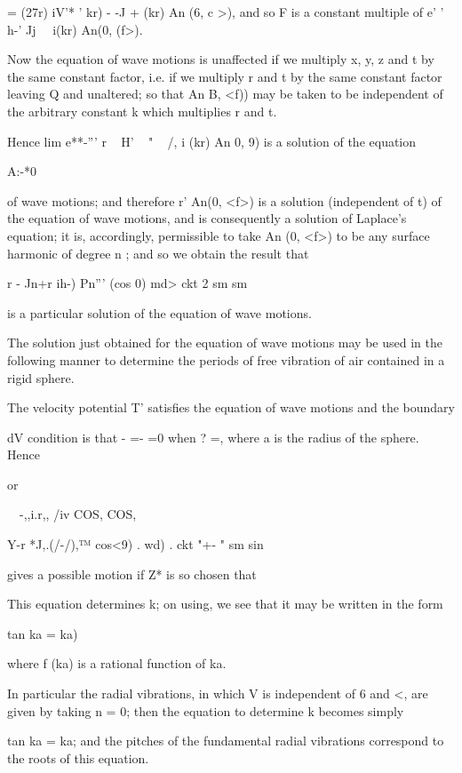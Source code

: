 = (27r) iV'* ' kr) - -J + (kr) An (6, c >), and so F is a constant
multiple of e' ' h-' Jj \ \ i(kr) An(0, (f>).

Now the equation of wave motions is unaffected if we multiply x, y, z
and t by the same constant factor, i.e. if we multiply r and t by the
same constant factor leaving Q and unaltered; so that An B, <f)) may
be taken to be independent of the arbitrary constant k which
multiplies r and t.

Hence lim e**-''' r ~ H' ~ " ~ /, i (kr) An 0, 9) is a solution of
the equation

A:-*0

of wave motions; and therefore r' An(0, <f>) is a solution
(independent of t) of the equation of wave motions, and is
consequently a solution of Laplace's equation; it is, accordingly,
permissible to take An (0, <f>) to be any surface harmonic of degree n
; and so we obtain the result that

r - Jn+r ih-) Pn''' (cos 0) md> ckt 2 sm sm

is a particular solution of the equation of wave motions.

%
%


The solution just obtained for the equation of wave motions may be
used in the following manner to determine the periods of free
vibration of air contained in a rigid sphere.

The velocity potential T' satisfies the equation of wave motions and
the boundary

dV condition is that - =- =0 when ? =, where a is the radius of the
sphere. Hence

or

~\ -,,i.r,, /iv COS, COS,

Y-r *J,.(/-/),™ cos<9) . wd) . ckt "+- " sm sin

gives a possible motion if Z* is so chosen that

This equation determines k; on using, we see that it may be
written in the form

tan ka = ka)

where f (ka) is a rational function of ka.

In particular the radial vibrations, in which V is independent of 6
and <, are given by taking n = 0; then the equation to determine k
becomes simply

tan ka = ka; and the pitches of the fundamental radial vibrations
correspond to the roots of this equation.

